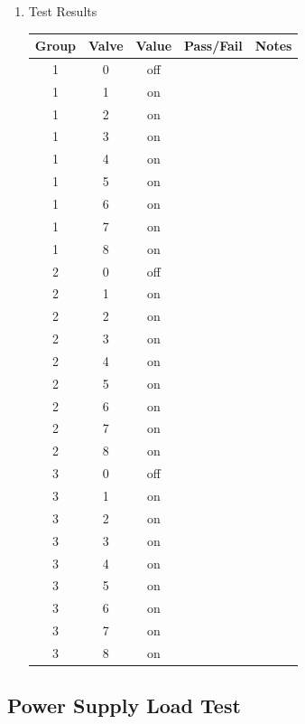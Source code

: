 \documentclass{article}
\begin{document}
\begin{enumerate}
\pagebreak
\item Test Results \\
	\vspace{1em}
	\begin{tabular}{|c|c|c|c|c|}
		\hline
		Group & Valve & Value & Pass/Fail & Notes \\
		\hline
		1 & 0 & off && \hspace{20em} \\
		\hline
		1 & 1 & on && \\
		\hline
		1 & 2 & on && \\
		\hline
		1 & 3 & on && \\
		\hline
		1 & 4 & on && \\
		\hline
		1 & 5 & on && \\
		\hline
		1 & 6 & on && \\
		\hline
		1 & 7 & on && \\
		\hline
		1 & 8 & on && \\
		\hline
		\hline
		2 & 0 & off && \\
		\hline
		2 & 1 & on && \\
		\hline
		2 & 2 & on && \\
		\hline
		2 & 3 & on && \\
		\hline
		2 & 4 & on && \\
		\hline
		2 & 5 & on && \\
		\hline
		2 & 6 & on && \\
		\hline
		2 & 7 & on && \\
		\hline
		2 & 8 & on && \\
		\hline
		\hline
		3 & 0 & off && \\
		\hline
		3 & 1 & on && \\
		\hline
		3 & 2 & on && \\
		\hline
		3 & 3 & on && \\
		\hline
		3 & 4 & on && \\
		\hline
		3 & 5 & on && \\
		\hline
		3 & 6 & on && \\
		\hline
		3 & 7 & on && \\
		\hline
		3 & 8 & on && \\
		\hline
	\end{tabular}
\end{enumerate}

\clearpage
\subsection{Power Supply Load Test}
\end{document}
